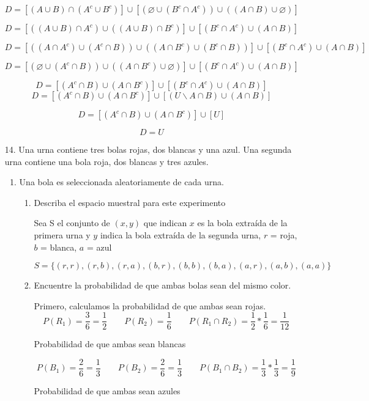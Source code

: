 \documentclass[letterpaper,11pt]{article}
\renewcommand{%
	\contentsname}{\vspace{-1cm} \hfill\bfseries\LARGE Índice \hfill \vspace{0.2cm}%
}
\begin{document}
\begin{enumerate}
$$
D= [(A \cup B) \cap (A^c \cup B^c)] \cup [( \varnothing  \cup (B^c \cap A^c) ) \cup 
((A \cap B) \cup \varnothing )]
$$

$$
D= [((A \cup B) \cap A^c) \cup ((A \cup B) \cap B^c) ] \cup [ (B^c \cap A^c) \cup 
(A \cap B)]
$$

$$
D= [((A \cap A^c) \cup (A^c \cap B)) \cup ((A \cap B^c) \cup (B^c \cap B)) ] \cup [ (B^c \cap A^c) \cup (A \cap B)]
$$

$$
D= [(\varnothing \cup (A^c \cap B)) \cup ((A \cap B^c) \cup \varnothing) ] \cup [ (B^c \cap A^c) \cup (A \cap B)]
$$

$$
D= [(A^c \cap B) \cup (A \cap B^c) ] \cup [ (B^c \cap A^c) \cup (A \cap B)]
$$
%
$$
D= [(A^c \cap B) \cup (A \cap B^c) ] \cup [(U\backslash A\cap B) \cup (A \cap B)]
$$

$$
D= [(A^c \cap B) \cup (A \cap B^c) ] \cup [U]
$$

$$
D= U
$$

\item[14.] Una urna contiene tres bolas rojas, dos blancas y una azul. Una segunda urna contiene una bola roja, dos blancas y tres azules. 

\begin{enumerate}
	\item Una bola es seleccionada aleatoriamente de cada urna.
	\begin{enumerate}
		\item Describa el espacio muestral para este experimento
		
		Sea S el conjunto de $(x,y)$ que indican $x$ es la bola extraída de la primera urna y $y$ indica la bola extraída de la segunda urna, $r$ = roja, $b$ = blanca, $a$ = azul

		$$
		S=\{ (r,r), (r,b), (r,a), (b,r), (b,b), (b,a), (a,r), (a,b), (a,a) \}
		$$

		\item Encuentre la probabilidad de que ambas bolas sean del mismo color.
		
		Primero, calculamos la probabilidad de que ambas sean rojas. 
		$$P(R_1)= \frac{3}{6} = \frac{1}{2} \qquad P(R_2) = \frac{1}{6} \qquad P(R_1 \cap R_2)= \frac{1}{2} * \frac{1}{6} = \frac{1}{12} $$

		Probabilidad de que ambas sean blancas

		$$P(B_1)= \frac{2}{6} = \frac{1}{3} \qquad P(B_2) = \frac{2}{6}= \frac{1}{3} \qquad P(B_1 \cap B_2)= \frac{1}{3} * \frac{1}{3} = \frac{1}{9} $$

		Probabilidad de que ambas sean azules


\end{enumerate}
\end{enumerate}
\end{enumerate}
\end{document}
